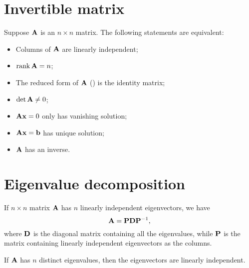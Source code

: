 \documentclass[hyperref, a4paper]{article}
\newcommand*{\mat}[1]{\vb{#1}}
\begin{document}
\section{Invertible matrix}

Suppose $\mat{A}$ is an $n \times n$ matrix.
The following statements are equivalent:
\begin{itemize}
    \item Columns of $\mat{A}$ are linearly independent;
    \item $\rank \mat{A} = n$;
    \item The reduced form of $\mat{A}$ () 
        is the identity matrix;
    \item $\det \mat{A} \neq 0$;
    \item $\mat{A} \vb{x} = 0$ only has vanishing solution;
    \item $\mat{A} \vb{x} = \vb{b}$ has unique solution;
    \item $\mat{A}$ has an inverse.
\end{itemize}

\section{Eigenvalue decomposition}

If $n \times n$ matrix $\mat{A}$ has $n$ linearly independent eigenvectors, 
we have 
\begin{equation}
    \mat{A} = \mat{P} \mat{D} \mat{P}^{-1},
\end{equation}
where $\mat{D}$ is the diagonal matrix 
containing all the eigenvalues, 
while $\mat{P}$ is the matrix containing linearly independent eigenvectors 
as the columns. 

If $\mat{A}$ has $n$ distinct eigenvalues, 
then the eigenvectors are linearly independent.
\end{document}
